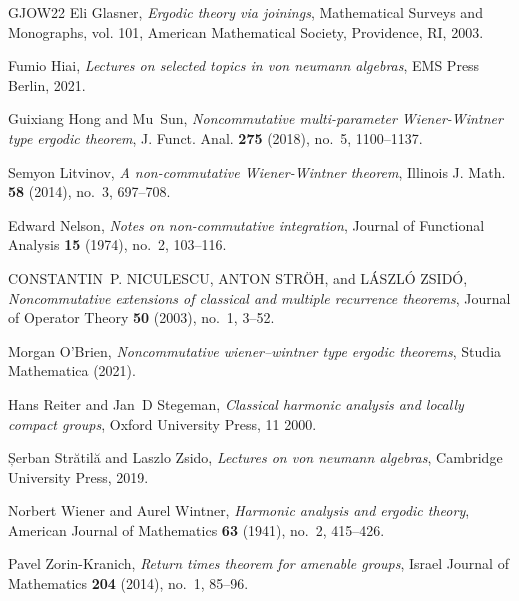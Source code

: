 \documentclass[11pt]{amsart}
\theoremstyle{definition}
\theoremstyle{myremark}
\numberwithin{equation}{section}
\begin{document}
\begin{thebibliography}{GJOW22}
Eli Glasner, \emph{Ergodic theory via joinings}, Mathematical Surveys and Monographs, vol. 101, American Mathematical Society, Providence, RI, 2003. 

Fumio Hiai, \emph{Lectures on selected topics in von neumann algebras}, EMS Press Berlin, 2021.

Guixiang Hong and Mu~Sun, \emph{Noncommutative multi-parameter {W}iener-{W}intner type ergodic theorem}, J. Funct. Anal. \textbf{275} (2018), no.~5, 1100--1137. 

Semyon Litvinov, \emph{A non-commutative {W}iener-{W}intner theorem}, Illinois J. Math. \textbf{58} (2014), no.~3, 697--708. 

Edward Nelson, \emph{Notes on non-commutative integration}, Journal of Functional Analysis \textbf{15} (1974), no.~2, 103--116.

CONSTANTIN~P. NICULESCU, ANTON STRÖH, and LÁSZLÓ ZSIDÓ, \emph{Noncommutative extensions of classical and multiple recurrence theorems}, Journal of Operator Theory \textbf{50} (2003), no.~1, 3--52.

Morgan O'Brien, \emph{Noncommutative wiener–wintner type ergodic theorems}, Studia Mathematica (2021).

Hans Reiter and Jan~D Stegeman, \emph{Classical harmonic analysis and locally compact groups}, Oxford University Press, 11 2000.

Șerban Str{\u{a}}til{\u{a}} and Laszlo Zsido, \emph{Lectures on von neumann algebras}, Cambridge University Press, 2019.

Norbert Wiener and Aurel Wintner, \emph{Harmonic analysis and ergodic theory}, American Journal of Mathematics \textbf{63} (1941), no.~2, 415--426.

Pavel Zorin-Kranich, \emph{Return times theorem for amenable groups}, Israel Journal of Mathematics \textbf{204} (2014), no.~1, 85--96.



\end{thebibliography}
 


   
\end{document}
